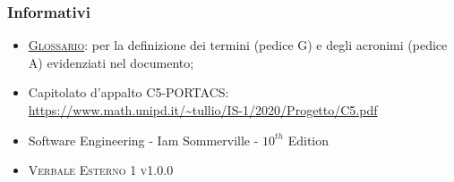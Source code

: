 \subsubsection{Informativi}
\begin{itemize}
\item \textsc{\href{https://github.com/Three-Way-Milkshake/docs/wiki/Glossario}{Glossario}}: per la definizione dei termini (pedice G) e degli acronimi (pedice A) evidenziati nel documento;
\item Capitolato d'appalto C5-PORTACS: \\
{\url{https://www.math.unipd.it/~tullio/IS-1/2020/Progetto/C5.pdf}}
\item Software Engineering - Iam Sommerville - $10^{th}$ Edition
\item \textsc{Verbale Esterno 1 v1.0.0}


\end{itemize}